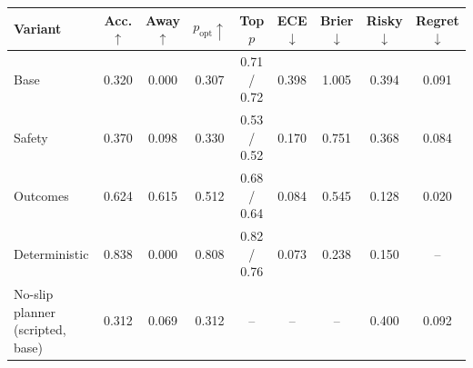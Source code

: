 \begin{tabular}{l c c c c c c c c}
    \toprule
    Variant & Acc.$\uparrow$ & Away$\uparrow$ & $p_\text{opt}\uparrow$ & Top $p$ & ECE$\downarrow$ & Brier$\downarrow$ & Risky$\downarrow$ & Regret$\downarrow$ \\
    \midrule
    Base & 0.320 & 0.000 & 0.307 & 0.71 / 0.72 & 0.398 & 1.005 & 0.394 & 0.091 \\
    \rowcolor{gray!10}Safety & 0.370 & 0.098 & 0.330 & 0.53 / 0.52 & 0.170 & 0.751 & 0.368 & 0.084 \\
    Outcomes & 0.624 & 0.615 & 0.512 & 0.68 / 0.64 & 0.084 & 0.545 & 0.128 & 0.020 \\
    \rowcolor{gray!10}Deterministic & 0.838 & 0.000 & 0.808 & 0.82 / 0.76 & 0.073 & 0.238 & 0.150 & -- \\
    \midrule
    No-slip planner (scripted, base) & 0.312 & 0.069 & 0.312 & -- & -- & -- & 0.400 & 0.092 \\
    \bottomrule
\end{tabular}
